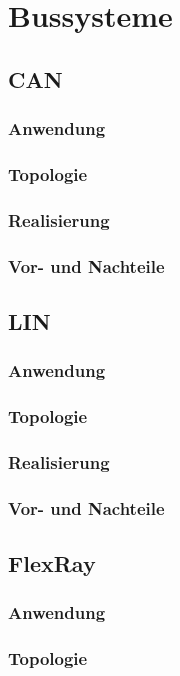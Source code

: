 \graphicspath{{./Images/Kapitel4/}}

\section{Bussysteme}
\subsection{CAN}
\subsubsection{Anwendung}
\subsubsection{Topologie}
\subsubsection{Realisierung}
\subsubsection{Vor- und Nachteile}

\subsection{LIN}
\subsubsection{Anwendung}
\subsubsection{Topologie}
\subsubsection{Realisierung}
\subsubsection{Vor- und Nachteile}

\subsection{FlexRay}
\subsubsection{Anwendung}
\subsubsection{Topologie}
